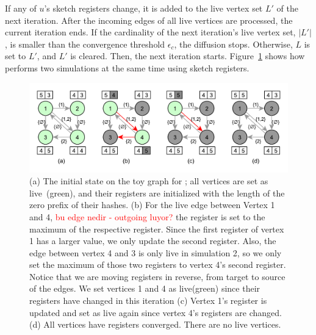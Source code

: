 \documentclass[10pt,journal,compsoc]{IEEEtran}
\newcommand\acro{{\sc{HyperFuseR\xspace}\xspace}\xspace}
\newcommand\kktodo[1]{\textcolor{red}{#1}}
\begin{document}


 If any of $u$'s sketch registers change, it is added to the live vertex set $L'$ of the next iteration. After the incoming edges of all live vertices are processed, the current iteration ends. If the cardinality of the next iteration's live vertex set, $|L'|$, is smaller than the convergence threshold $\epsilon_c$, the diffusion stops. Otherwise, $L$ is set to $L'$, and $L'$ is cleared. Then, the next iteration starts. Figure~\ref{fig:hf-processing} shows how \acro performs two simulations at the same time using sketch registers.
 
\begin{figure}[!ht]
    \begin{center}
    \includegraphics[width=0.7\linewidth]{images/sketch-diffusion.pdf}
    \caption{(a) The initial state on the toy graph for \acro{}; all vertices are set as live~(green), and their registers are initialized with the length of the zero prefix of their hashes. (b) 
    For the live edge between Vertex 1 and 4, \kktodo{bu edge nedir - outgoing luyor?} the register is set to the maximum of the respective register. Since the first register of vertex 1 has a larger value, we only update the second register. Also, the edge between vertex 4 and 3 is only live in simulation 2, so we only set the maximum of those two registers to vertex 4's second register. Notice that we are moving registers in reverse, from target to source of the edges. We set vertices 1 and 4 as live(green) since their registers have changed in this iteration (c) Vertex 1's register is updated and set as live again since vertex 4's registers are changed.  (d) All vertices have registers converged. There are no live vertices. }\label{fig:hf-processing} 
    \end{center}
    \end{figure} 
 
\end{document}
